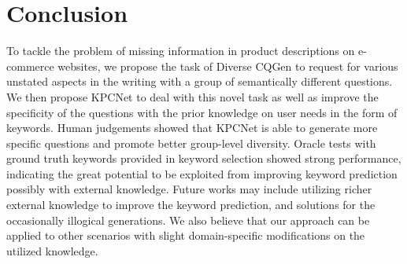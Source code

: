\section{Conclusion}
To tackle the problem of missing information in product descriptions on e-commerce websites, we propose the task of Diverse CQGen to request for various unstated aspects in the writing with a group of semantically different questions. We then propose KPCNet to deal with this novel task as well as improve the specificity of the questions with the prior knowledge on user needs in the form of keywords. Human judgements showed that KPCNet is able to generate more specific questions and promote better group-level diversity. Oracle tests with ground truth keywords provided in keyword selection showed strong performance, indicating the great potential to be exploited from improving keyword prediction possibly with external knowledge. Future works may include utilizing richer external knowledge to improve the keyword prediction, and solutions for the occasionally illogical generations. We also believe that our approach can be applied to other scenarios with slight domain-specific modifications on the utilized knowledge. 
